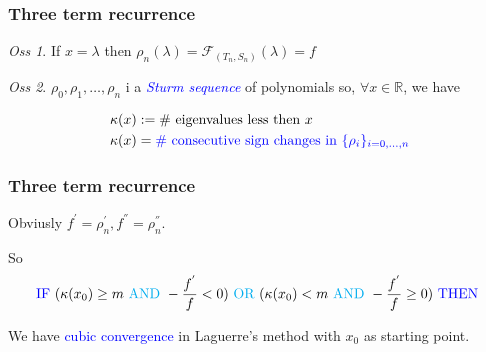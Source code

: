 \documentclass{beamer}
\newcommand{\R}{\mathbb{R}}
\newcommand{\effe}[2]{\mathcal{F}_{#1}(#2)}
\theoremstyle{definition} \newtheorem{de}{Def}
\theoremstyle{remark} \newtheorem{os}[de]{Oss}
\theoremstyle{plain} \newtheorem{te}[de]{Teo}
\theoremstyle{plain} \newtheorem{co}[de]{Cor}
\theoremstyle{plain} \newtheorem{pr}[de]{Prop}
\theoremstyle{plain} \newtheorem{lem}[de]{Lemm}
\theoremstyle{remark} \newtheorem{rem}[de]{Remark}
\begin{document}
\begin{frame}
  \frametitle{Three term recurrence}

  \begin{os}
    If $x = \lambda$ then $\rho_n(\lambda)=\effe{(T_n,S_n)}{\lambda}=f$
  \end{os}

  \begin{os}
    $\rho_0,\rho_1,\dots,\rho_n$ i a \textcolor{blue}{\emph{Sturm sequence}} of polynomials so, $\forall x\in\R$, we have

    \begin{align*}
      \kappa(x) &:= \text{\# eigenvalues less then } x \\
      \kappa(x) &= \textcolor{blue}{ \text{\# consecutive sign changes in } \{ \rho_i \}_{i=0,\dots,n} }
    \end{align*}
  \end{os}

  
\end{frame}

\begin{frame}
  \frametitle{Three term recurrence}

  Obviusly $f^{'}=\rho_n^{'},f^{''}=\rho_n^{''}$.



  \pause

  So 
  \begin{equation*}
    \textcolor{blue}{\text{IF }} ( \kappa(x_0)\ge m \textcolor{cyan}{\text{ AND }} -\frac{f^{'}}{f}< 0 ) \textcolor{cyan}{\text{ OR }} ( \kappa(x_0) < m \textcolor{cyan}{\text{ AND }} -\frac{f^{'}}{f}\ge 0 ) \textcolor{blue}{\text{ THEN }}
  \end{equation*}

  \pause

  We have \textcolor{blue}{cubic convergence} in Laguerre's method with $x_0$ as starting point.

\end{frame}
\end{document}
